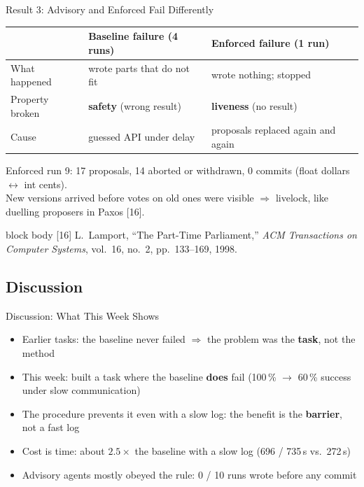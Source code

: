 \documentclass[aspectratio=169,11pt]{beamer}
\newcommand{\papercite}[1]{%
  \vfill
  \begin{beamercolorbox}[wd=\textwidth,sep=3pt]{block body}
    \tiny #1
  \end{beamercolorbox}}
\begin{document}

\begin{frame}{Result 3: Advisory and Enforced Fail Differently}
  \small
  \begin{tabular}{p{3.2cm}p{4.8cm}p{4.8cm}}
    \toprule
    & Baseline failure (4 runs) & Enforced failure (1 run) \\
    \midrule
    What happened & wrote parts that do not fit & wrote nothing; stopped \\
    \leavevmode\pause Property broken & \textbf{safety} (wrong result) & \textbf{liveness} (no result) \\
    \leavevmode\pause Cause & guessed API under delay & proposals replaced again and again \\
    \bottomrule
  \end{tabular}

  \vspace{0.6em}
  \pause\footnotesize
  Enforced run 9: 17 proposals, 14 aborted or withdrawn, 0 commits (float dollars $\leftrightarrow$ int cents).\\
  New versions arrived before votes on old ones were visible $\Rightarrow$ livelock, like duelling proposers in Paxos [16].
  \papercite{[16] L.\ Lamport, ``The Part-Time Parliament,'' \textit{ACM Transactions on Computer Systems}, vol.\ 16, no.\ 2, pp.\ 133--169, 1998.}
\end{frame}


\subsection{Discussion}
\begin{frame}{Discussion: What This Week Shows}
  \small
  \begin{itemize}
    \item Earlier tasks: the baseline never failed $\Rightarrow$ the problem was the \textbf{task}, not the method
    \pause
    \item This week: built a task where the baseline \textbf{does} fail (100\,\% $\to$ 60\,\% success under slow communication)
    \pause
    \item The procedure prevents it even with a slow log: the benefit is the \textbf{barrier}, not a fast log
    \pause
    \item Cost is time: about $2.5\times$ the baseline with a slow log (696 / 735\,s vs.\ 272\,s)
    \pause
    \item Advisory agents mostly obeyed the rule: 0 / 10 runs wrote before any commit
  \end{itemize}
\end{frame}
\end{document}
